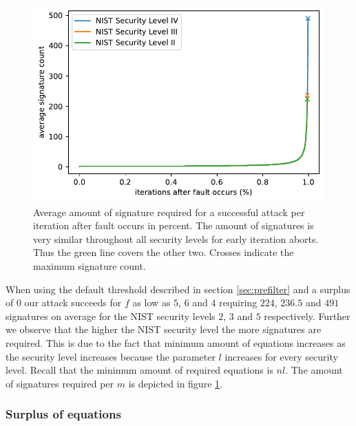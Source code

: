 \documentclass[a4paper,titlepage]{article}
\begin{document}
\begin{figure}
	\centering
	\includegraphics[width=\linewidth]{plots/dilithium_sigcount_noparams}
	\caption{Average amount of signature required for a successful attack per iteration after fault occurs in percent. The amount of signatures is very similar throughout all security levels for early iteration aborts. Thus the green line covers the other two. Crosses indicate the maximum signature count.}
	\label{fig:dilithiumsigcountnoparams}
\end{figure} 

When using the default threshold described in section \ref{sec:prefilter} and a surplus of $0$ our attack succeeds for $f$ as low as $5$, $6$ and $4$ requiring $224$, $236.5$ and $491$ signatures on average for the NIST security levels $2$, $3$ and $5$ respectively.
Further we observe that the higher the NIST security level the more signatures are required. This is due to the fact that minimum amount of equations increases as the security level increases  because the parameter $l$ increases for every security level.  Recall that the minimum amount of required equations is $nl$. The amount of signatures required per $m$ is depicted in figure \ref{fig:dilithiumsigcountnoparams}.

\subsubsection{Surplus of equations}
\label{sec:dilithiumsurplus}
\end{document}
